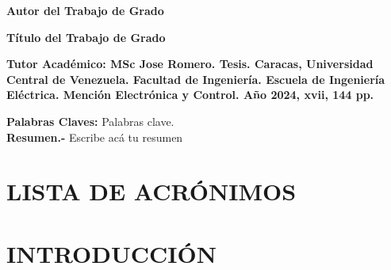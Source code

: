 \documentclass[letterpaper,titlepage,12pt,oneside,spanish,final]{report_eie}
\begin{document}
\newpage
\renewcommand*{\abstract}{\begin{center}\end{center}}
\begin{spacing}{1}
\begin{center}%

\textbf{Autor del Trabajo de Grado}

\begin{large}
\textbf{Título del Trabajo de Grado}
\end{large}
\end{center}

\noindent%
\textbf{Tutor Académico: MSc Jose Romero. Tesis.
Caracas, Universidad Central de Venezuela. Facultad de Ingeniería.
Escuela de Ingeniería Eléctrica. Mención Electrónica y Control. Año 2024,
xvii, 144 pp.}

\noindent
\textbf{Palabras Claves:} Palabras clave. \\[1ex]

\noindent \textbf{Resumen.-} Escribe acá tu resumen

\end{spacing}

%
\thispagestyle{empty}%
\renewcommand{\baselinestretch}{1.5}%
\addtocounter{page}{3}%
\setlength{\parskip}{3pt}%

\tableofcontents%

\listoffigures%

\listoftables%


\chapter*{LISTA DE ACRÓNIMOS}%
%


\chapter*{INTRODUCCIÓN}\label{CAP:intro}
\setlength{\parskip}{14pt}%
%
\end{document}
